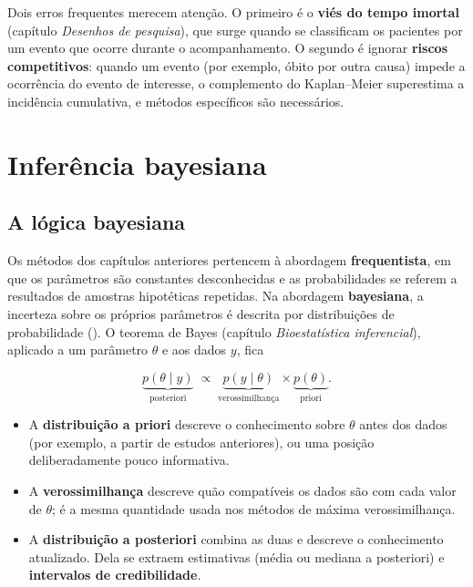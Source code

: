 \documentclass[
]{book}
\providecommand{\tightlist}{%
  \setlength{\itemsep}{0pt}\setlength{\parskip}{0pt}}
\begin{document}
Dois erros frequentes merecem atenção. O primeiro é o \textbf{viés do tempo imortal} (capítulo \emph{Desenhos de pesquisa}), que surge quando se classificam os pacientes por um evento que ocorre durante o acompanhamento. O segundo é ignorar \textbf{riscos competitivos}: quando um evento (por exemplo, óbito por outra causa) impede a ocorrência do evento de interesse, o complemento do Kaplan--Meier superestima a incidência cumulativa, e métodos específicos são necessários.

\section{Inferência bayesiana}\label{inferuxeancia-bayesiana}

\subsection{A lógica bayesiana}\label{a-luxf3gica-bayesiana}

Os métodos dos capítulos anteriores pertencem à abordagem \textbf{frequentista}, em que os parâmetros são constantes desconhecidas e as probabilidades se referem a resultados de amostras hipotéticas repetidas. Na abordagem \textbf{bayesiana}, a incerteza sobre os próprios parâmetros é descrita por distribuições de probabilidade (). O teorema de Bayes (capítulo \emph{Bioestatística inferencial}), aplicado a um parâmetro \(\theta\) e aos dados \(y\), fica

\[
\underbrace{p(\theta \mid y)}_{\text{posteriori}} \;\propto\; \underbrace{p(y \mid \theta)}_{\text{verossimilhança}} \times \underbrace{p(\theta)}_{\text{priori}} .
\]

\begin{itemize}
\tightlist
\item
  A \textbf{distribuição a priori} descreve o conhecimento sobre \(\theta\) antes dos dados (por exemplo, a partir de estudos anteriores), ou uma posição deliberadamente pouco informativa.
\item
  A \textbf{verossimilhança} descreve quão compatíveis os dados são com cada valor de \(\theta\); é a mesma quantidade usada nos métodos de máxima verossimilhança.
\item
  A \textbf{distribuição a posteriori} combina as duas e descreve o conhecimento atualizado. Dela se extraem estimativas (média ou mediana a posteriori) e \textbf{intervalos de credibilidade}.
\end{itemize}
\end{document}
